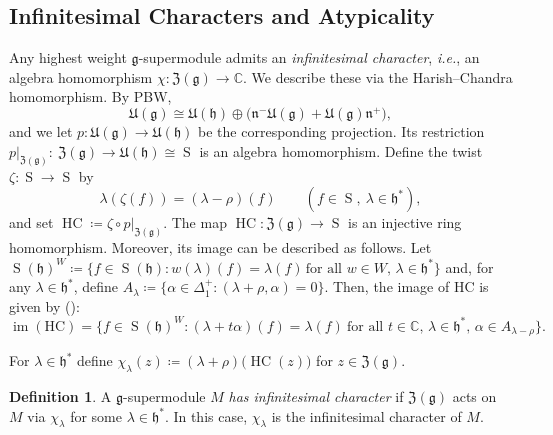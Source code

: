 \documentclass[11pt]{amsart}
\renewcommand{\Im}{\operatorname{im}}
\def\CC{{\mathbb C}}
\def\hh{{\mathfrak h}}
\def\nn {{\mathfrak{n}}}
\def\gg{{\mathfrak{g}}}
\def\UE{{\mathfrak U}}
\theoremstyle{plain}
\theoremstyle{remark}
\theoremstyle{definition}
\newtheorem{definition}[theorem]{Definition}
\numberwithin{equation}{section}
\theoremstyle{remark}
\begin{document}
\subsection{Infinitesimal Characters and Atypicality} \label{subsec::atyicality}
Any highest weight $\gg$-supermodule admits an \emph{infinitesimal character}, \emph{i.e.}, an algebra homomorphism
$\chi:\mathfrak Z(\gg)\to\CC$. We describe these via the Harish--Chandra homomorphism. By PBW,
\begin{equation}
\mathfrak{U}(\gg)\cong \UE(\hh)\oplus\bigl(\nn^{-}\mathfrak{U}(\gg)+\mathfrak{U}(\gg)\nn^{+}\bigr),
\end{equation}
and we let $p:\mathfrak{U}(\gg)\to \UE(\hh)$ be the corresponding projection. Its restriction
$
p|_{\mathfrak Z(\gg)}:\ \mathfrak Z(\gg)\to \UE(\hh)\cong \operatorname{S}
$
is an algebra homomorphism. Define the twist $\zeta:\operatorname{S}\to \operatorname{S}$ by
\begin{equation}
\lambda(\zeta(f))=(\lambda-\rho)(f)\qquad(f\in \operatorname{S},\ \lambda\in\hh^{\ast}),
\end{equation}
and set $\operatorname{HC}\coloneqq\zeta\circ p|_{\mathfrak Z(\gg)}$. The map $\operatorname{HC}:\mathfrak Z(\gg)\to \operatorname{S}$ is an injective ring homomorphism. Moreover, its image can be described as follows. Let $\operatorname{S}(\hh)^{W}\coloneqq \{ f \in \operatorname{S}(\hh) : w(\lambda)(f)=\lambda(f) \, \text{for all } w \in W, \, \lambda \in \hh^{\ast} \}$ and, for any $\lambda \in \hh^{\ast}$, define
$
 A_{\lambda}\coloneqq \{ \alpha \in \Delta_{1}^{+} : (\lambda + \rho, \alpha)=0 \}.
$
 Then, the image of $\text{HC}$ is given by (\cite{kac1984laplace,sergeev1987enveloping,sergeev1988invariant}):
 \begin{equation*}
 \Im(\text{HC})=\bigl\{ f \in \operatorname{S}(\hh)^{W} : (\lambda + t\alpha)(f)=\lambda(f) \ 
 \text{for all } t \in \CC, \, \lambda \in \hh^{\ast}, \, \alpha \in A_{\lambda - \rho} \bigr\}.
 \end{equation*}

For $\lambda\in\hh^{\ast}$ define $\chi_{\lambda}(z)\coloneqq (\lambda+\rho)\bigl(\operatorname{HC}(z)\bigr)$ for $z\in\mathfrak Z(\gg)$.

\begin{definition}
A $\gg$-supermodule $M$ \emph{has infinitesimal character} if $\mathfrak Z(\gg)$ acts on $M$ via $\chi_{\lambda}$ for some
$\lambda\in\hh^{\ast}$. In this case, $\chi_{\lambda}$ is the infinitesimal character of $M$.
\end{definition}
\end{document}
